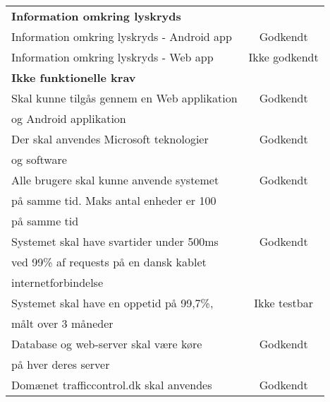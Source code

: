 \begin{tabular}{ l | c  }
		\textbf{Information omkring lyskryds} & \\
		Information omkring lyskryds - Android app & Godkendt\\
		Information omkring lyskryds - Web app & Ikke godkendt \\ \hline
		
		\textbf{Ikke funktionelle  krav} \\ \hline
		Skal kunne tilgås gennem en Web applikation & Godkendt\\
		og Android applikation &\\
		\hline
		Der skal anvendes Microsoft teknologier & Godkendt\\
		og software &\\
		\hline
		Alle brugere skal kunne anvende systemet & Godkendt\\
		på samme tid. Maks antal enheder er 100 & \\
		på samme tid & \\
		\hline
		Systemet skal have svartider under 500ms & Godkendt\\
		ved 99\% af requests på en dansk kablet & \\
		internetforbindelse & \\
		\hline
		Systemet skal have en oppetid på 99,7\%, & Ikke testbar\\
		målt over 3 måneder & \\
		\hline
		Database og web-server skal være køre & Godkendt\\
		på hver deres server & \\
		\hline
		Domænet trafficcontrol.dk skal anvendes & Godkendt\\
		\hline
	\end{tabular}